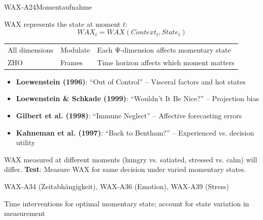 \begin{axiomspec}{WAX-A24}{Momentaufnahme}

WAX represents the state at moment $t$:
\begin{equation}
WAX_t = WAX(Context_t, State_t)
\end{equation}

\begin{tabular}{lll}
All dimensions & Modulate & Each Ψ-dimension affects momentary state \\
ZHO & Frames & Time horizon affects which moment matters \\
\end{tabular}

\begin{itemize}
\item \textbf{Loewenstein (1996)}: ``Out of Control'' -- Visceral factors and hot states
\item \textbf{Loewenstein \& Schkade (1999)}: ``Wouldn't It Be Nice?'' -- Projection bias
\item \textbf{Gilbert et al. (1998)}: ``Immune Neglect'' -- Affective forecasting errors
\item \textbf{Kahneman et al. (1997)}: ``Back to Bentham?'' -- Experienced vs. decision utility
\end{itemize}

WAX measured at different moments (hungry vs. satiated, stressed vs. calm) will differ.
\textbf{Test}: Measure WAX for same decision under varied momentary states.

WAX-A34 (Zeitabhängigkeit), WAX-A36 (Emotion), WAX-A39 (Stress)

Time interventions for optimal momentary state; account for state variation in measurement

\end{axiomspec}


